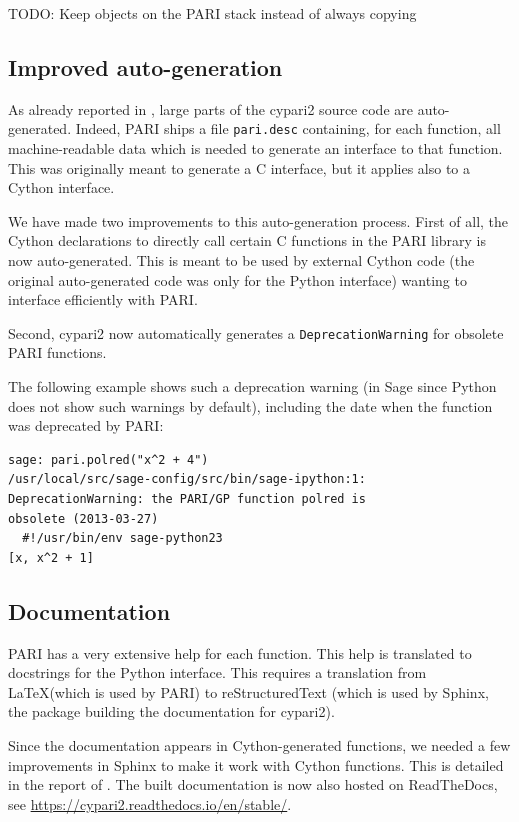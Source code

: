 \documentclass{deliverablereport}
\begin{document}
TODO: Keep objects on the PARI stack instead of always copying

\subsection{Improved auto-generation}

As already reported in ,
large parts of the cypari2 source code are auto-generated.
Indeed, PARI ships a file \verb/pari.desc/ containing,
for each function, all machine-readable data which is needed to generate
an interface to that function.
This was originally meant to generate a C interface,
but it applies also to a Cython interface.

We have made two improvements to this auto-generation process.
First of all,
the Cython declarations to directly call certain C functions
in the PARI library is now auto-generated.
This is meant to be used by external Cython code
(the original auto-generated code was only for the Python interface)
wanting to interface efficiently with PARI.

Second, cypari2 now automatically
generates a \texttt{DeprecationWarning}
for obsolete PARI functions.

The following example shows such a deprecation warning
(in Sage since Python does not show such warnings by default),
including the date when the function was deprecated by PARI:
\begin{verbatim}
sage: pari.polred("x^2 + 4")
/usr/local/src/sage-config/src/bin/sage-ipython:1:
DeprecationWarning: the PARI/GP function polred is
obsolete (2013-03-27)
  #!/usr/bin/env sage-python23
[x, x^2 + 1]
\end{verbatim}

\subsection{Documentation}

PARI has a very extensive help for each function.
This help is translated to docstrings for the Python interface.
This requires a translation from \LaTeX (which is used by PARI)
to reStructuredText (which is used by Sphinx,
the package building the documentation for cypari2).

Since the documentation appears in Cython-generated functions,
we needed a few improvements in Sphinx to make it work
with Cython functions.
This is detailed in the report of .
The built documentation is now also hosted on ReadTheDocs,
see \url{https://cypari2.readthedocs.io/en/stable/}.
\end{document}
